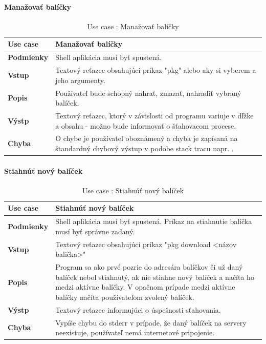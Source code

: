 \paragraph{Manažovať balíčky}
\begin{center}
	\begin{table}[htbp]
		\begin{tabular}{|p{2.5cm}|p{14cm}|}
			\hline
			\textbf{Use case} & Manažovať balíčky \\ 
			\hline
			\textbf{Podmienky} & Shell aplikácia musí byť spustená.\\ 
			\hline
			\textbf{Vstup} & Textový reťazec obsahujúci príkaz "pkg" alebo aky si vyberem a jeho argumenty.\\
			\hline
			\textbf{Popis} & Používateľ bude schopný nahrať, zmazať, nahradiť vybraný balíček. \\ 
			\hline
			\textbf{Výstp} & Textový reťazec, ktorý v závislosti od programu variuje v dľžke a obsahu - možno bude informovať o šťahovacom procese.\\
			\hline
			\textbf{Chyba} & O chybe je používateľ oboznámený a chyba je zapísaná na štandardný chybový výstup v podobe stack tracu napr. .\\
			\hline
		\end{tabular}
	\label{table:1}
	\caption{Use case : Manažovať balíčky}
	\end{table}
\end{center}
\newpage
\paragraph{Stiahnúť nový balíček}
\begin{center}
	\begin{table}[htbp]
		\begin{tabular}{|p{2.5cm}|p{14cm}|}
			\hline
			\textbf{Use case} & Stiahnúť nový balíček \\ 
			\hline
			\textbf{Podmienky} & Shell aplikácia musí byť spustená. Príkaz na stiahnutie balíčka musí byť správne zadaný.\\ 
			\hline
			\textbf{Vstup} & Textový reťazec obsahujúci príkaz "pkg download <názov balička>"\\
			\hline
			\textbf{Popis} & Program sa ako prvé pozrie do adresára balíčkov či už daný balíček nebol stiahnutý, ak nie stiahne nový balíček a načíta ho medzi aktívne balíčky. V opačnom prípade medzi aktívne balíčky načíta používateľom zvolený balíček.\\ 
			\hline
			\textbf{Výstp} & Textový reťazec  informujúci o úspešnosti sťahovania.\\
			\hline
			\textbf{Chyba} & Vypíše chybu do stderr v prípade, že daný balíček na servery neexistuje, používateľ nemá internetové pripojenie.\\
			\hline
		\end{tabular}
		\label{table:1}
		\caption{Use case : Stiahnúť nový balíček}
	\end{table}
\end{center}
